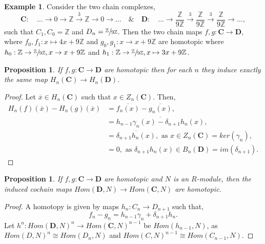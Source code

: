 \documentclass[11.5pt, twoside, a4paper, titlepage]{report}
\providecommand{\bb}[1]{\mathbb{#1}}
\theoremstyle{definition}
\newtheorem{eg}[mydef]{Example}
\theoremstyle{plain}
\newtheorem{prop}[mydef]{Proposition}
\begin{document}
\begin{eg}
Consider the two chain complexes,
\begin{equation*}
\mathbf{C}: \quad \dots \xrightarrow{} 0 \xrightarrow{} \bb{Z} \xrightarrow{3} \bb{Z} \xrightarrow{} 0 \xrightarrow{} \dots \quad \& \quad \mathbf{D}: \quad \dots \xrightarrow{} \frac{\bb{Z}}{9\bb{Z}} \xrightarrow{3} \frac{\bb{Z}}{9\bb{Z}} \xrightarrow{3} \frac{\bb{Z}}{9\bb{Z}} \xrightarrow{} \dots,
\end{equation*}
such that $C_1,C_0=\bb{Z}$ and $D_n=\sfrac{\bb{Z}}{9\bb{Z}}$. Then the two chain maps $f, g:\mathbf{C} \to \mathbf{D}$, where $f_0, f_1: x \mapsto 4x+9\bb{Z}$ and $g_0, g_1: x \to x+9\bb{Z}$ are homotopic where $h_0: \bb{Z} \to \sfrac{\bb{Z}}{9\bb{Z}}, x \to x+9\bb{Z}$ and $h_1: \bb{Z} \to \sfrac{\bb{Z}}{9\bb{Z}}, x \mapsto 3x +9\bb{Z}$.
\end{eg}

\begin{prop} \label{homotopyhomologyprop}
If $f,g:\mathbf{C}\to \mathbf{D}$ are homotopic then for each $n$ they induce exactly the same map $H_n(\mathbf{C})\to H_n(\mathbf{D})$.
\end{prop}
\begin{proof}
Let $\overline{x} \in H_n(\mathbf{C})$ such that $x\in Z_n(\mathbf{C})$. Then,
\begin{align*}
H_n(f)(\overline{x})-H_n(g)(\overline{x})&= \overline{f_n(x)} - \overline{g_n(x)},\\
&= \overline{h_{n-1}\gamma_n(x)-\delta_{n+1}h_n(x)},\\
&=\overline{\delta_{n+1}h_n(x)}, \text{ as }x\in Z_n(\mathbf{C})=ker(\gamma_n),\\
&=0, \text{ as } \delta_{n+1}h_n(x)\in B_n(\mathbf{D})=im(\delta_{n+1}).
\end{align*}
\end{proof}

\begin{prop} %
If $f,g: \mathbf{C}\to \mathbf{D}$ are homotopic and $N$ is an $R$-module, then the induced cochain maps $Hom(\mathbf{D}, N) \to Hom(\mathbf{C},N)$ are homotopic.
\end{prop}
\begin{proof}
A homotopy is given by maps $h_n:C_n\to D_{n+1}$ such that, 
\begin{equation*}
f_n-g_n=h_{n-1}\gamma_n + \delta_{n+1}h_n.
\end{equation*}
Let $h^n:Hom(\mathbf{D},N)^n \to Hom(\mathbf{C}, N)^{n-1}$ be $Hom(h_{n-1}, N)$, as $Hom(D, N)^n \cong Hom(D_n, N)$ and $Hom(C, N)^{n-1} \cong Hom(C_{n-1}, N)$.
\end{proof}
\end{document}
